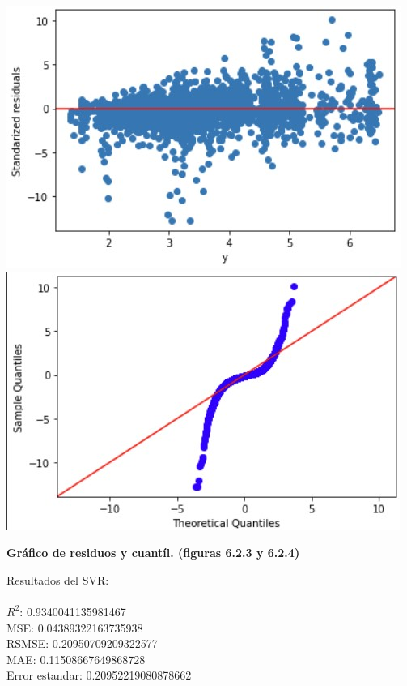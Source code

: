 \documentclass{article}
\begin{document}
                
                        \includegraphics[scale=0.6]{images/MLP_Stage_DS.jpg} 
                        \includegraphics[scale=0.6]{images/MLP_Stage_DS_Q.jpg} \\
                        \begin{center}
                            \textbf{Gráfico de residuos y cuantíl. (figuras 6.2.3 y 6.2.4)}
                        \end{center}
                        
                
            Resultados del SVR:\\
                    \\
                        $R^2$:  0.9340041135981467 \\
                        MSE:  0.04389322163735938 \\
                        RSMSE:  0.20950709209322577 \\
                        MAE:  0.11508667649868728 \\
                        Error estandar:  0.20952219080878662 \\
                
\end{document}
